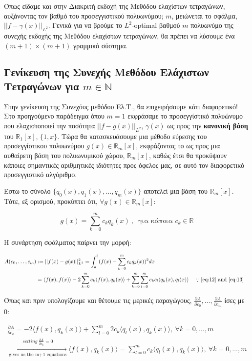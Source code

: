 \documentclass[12pt]{article}
\begin{document}
Όπως είδαμε και στην Διακριτή εκδοχή της Μεθόδου ελαχίστων τετραγώνων,
αυξάνοντας τον βαθμό του προσεγγιστικού πολυωνύμου; \(m\), μειώνεται το
σφάλμα, \(||f-\gamma (x)||_{L^2}\). Γενικά για να βρούμε το
\(L^2\)-optimal βαθμού \(m\) πολυωνύμο της συνεχής εκδοχής της Μεθόδου
ελαχίστων τετραγώνων, θα πρέπει να λύσουμε ένα \((m+1) \times (m+1)\)
γραμμικό σύστημα.

\subsection{Γενίκευση της Συνεχής Μεθόδου Ελάχιστων
Τετραγώνων για
\(m \in \mathbb{N}\)}

Στην γενίκευση της Συνεχόυς μεθόδου Ελ.Τ., θα επιχειρήσουμε κάτι
διαφορετικό! Στο προηγούμενο παράδειγμα όπου \(m=1\) εκφράσαμε το
προσεγγίστικό πολυώνυμο που ελαχιστοποιεί την ποσότητα
\(||f-g(x)||_{L^2}\), \(\gamma (x)\) ως προς την \textbf{κανονική βάση}
του \(\mathbb{R}_1[x]\), \(\{1,x\}\). Τώρα θα κατασκευάσουμε μια μέθοδο
εύρεσης του προσεγγίστικου πολυωνύμου \(g(x) \in \mathbb{R}_m[x]\),
εκφράζοντας το ως προς μια αυθαίρετη βάση του πολυωνυμικού χώρου,
\(\mathbb{R}_m[x]\), καθώς έτσι θα προκύψουν κάποιες σημαντικές
αριθμητικές ιδιότητες προς όφελος μας, σε αυτό τον διαφορετικό
προσεγγιστικό αλγόριθμο.

Έστω το σύνολο \(\{q_0(x),q_1(x),\dots,q_m(x)\}\) αποτελεί μια βάση του
\(\mathbb{R}_m[x]\). Tότε, εξ ορισμού, προκύπτει ότι,
\(\forall g(x) \in \mathbb{R}_m[x]\):

\[
g(x)=\sum_{k=0}^m c_kq_k(x) \ , \ \text{ για κάποια } c_k \in \mathbb{R} \nonumber
\]

H συνάρτηση σφάλματος παίρνει την μορφή:

\begin{align*}
A(c_0,\dots,c_m)&:=||f(x)-g(x)||^2_{L^2} = \int_a^b (f(x) -\sum_{k=0}^m c_kq_k(x))^2dx \\
                &= \langle f(x),f(x) \rangle -2\sum_{k=0}^m c_k\langle f(x),q_k(x) \rangle+\sum_{k=0}^m\sum_{l=0}^m c_kc_l\langle q_k(x),q_l(x) \rangle && \because \eqref{eq:12} \text{ and } \eqref{eq:13}
\end{align*}

Όπως και πριν υπολογίζουμε και θέτουμε τις μερικές παραγώγους,
\(\frac{\partial A}{\partial c_0},\dots,\frac{\partial A}{\partial c_m}\)
ίσες με 0:

\begin{gather*}
\frac{\partial A}{\partial c_k}=-2\langle f(x),q_k(x) \rangle+\sum_{l=0}^m 2c_k\langle q_l(x),q_k(x) \rangle, \ \forall k=0,\dots,m \\ \xrightarrow[\text{gives us the m+1 equations}]{setting \ \frac{\partial A}{\partial c_k}=0} 
\langle f(x),q_k(x) \rangle = \sum_{l=0}^m c_k\langle q_l(x),q_k(x) \rangle, \ \forall k=0,\dots,m 
\end{gather*}
\end{document}
